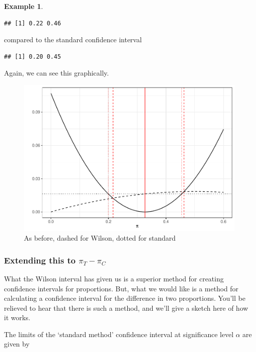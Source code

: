 \documentclass[
  openany]{book}
\theoremstyle{definition}
\theoremstyle{definition}
\newtheorem{example}{Example}[chapter]
\theoremstyle{definition}
\theoremstyle{definition}
\theoremstyle{remark}
\begin{document}
\begin{example}
\begin{verbatim}
## [1] 0.22 0.46
\end{verbatim}

compared to the standard confidence interval

\begin{verbatim}
## [1] 0.20 0.45
\end{verbatim}

Again, we can see this graphically.

\begin{figure}
\centering
\includegraphics{CT4H_notes_files/figure-latex/unnamed-chunk-37-1.pdf}
\caption{\label{fig:unnamed-chunk-37}As before, dashed for Wilson, dotted for standard}
\end{figure}

\end{example}

\subsubsection{\texorpdfstring{Extending this to \(\pi_T - \pi_C\)}{Extending this to \textbackslash pi\_T - \textbackslash pi\_C}}\label{newcombeci}

What the Wilson interval has given us is a superior method for creating confidence intervals for proportions. But, what we would like is a method for calculating a confidence interval for the difference in two proportions. You'll be relieved to hear that there is such a method, and we'll give a sketch here of how it works.

The limits of the `standard method' confidence interval at significance level \(\alpha\) are given by
\end{document}
